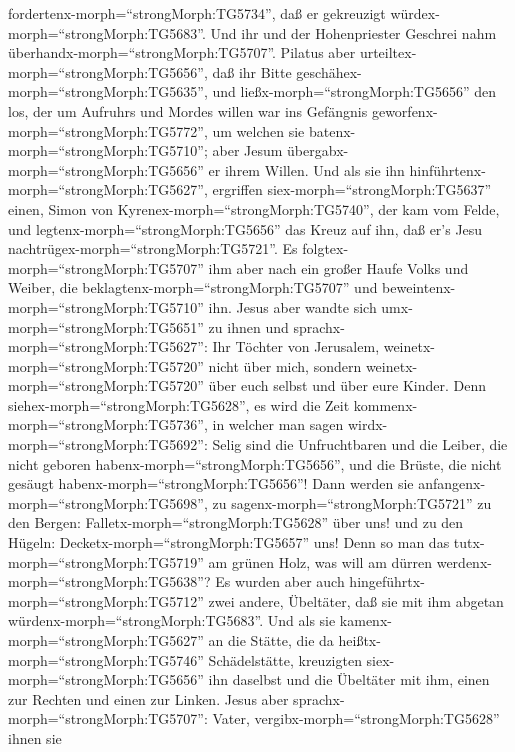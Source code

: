 fordertenx-morph=``strongMorph:TG5734'', daß er gekreuzigt
würdex-morph=``strongMorph:TG5683''. Und ihr und der Hohenpriester
Geschrei nahm überhandx-morph=``strongMorph:TG5707''. 
Pilatus aber urteiltex-morph=``strongMorph:TG5656'', daß ihr Bitte
geschähex-morph=``strongMorph:TG5635'',  und
ließx-morph=``strongMorph:TG5656'' den los, der um Aufruhrs und Mordes
willen war ins Gefängnis geworfenx-morph=``strongMorph:TG5772'', um
welchen sie batenx-morph=``strongMorph:TG5710''; aber Jesum
übergabx-morph=``strongMorph:TG5656'' er ihrem Willen.  Und
als sie ihn hinführtenx-morph=``strongMorph:TG5627'', ergriffen
siex-morph=``strongMorph:TG5637'' einen, Simon von
Kyrenex-morph=``strongMorph:TG5740'', der kam vom Felde, und
legtenx-morph=``strongMorph:TG5656'' das Kreuz auf ihn, daß er's Jesu
nachtrügex-morph=``strongMorph:TG5721''.  Es
folgtex-morph=``strongMorph:TG5707'' ihm aber nach ein großer Haufe
Volks und Weiber, die beklagtenx-morph=``strongMorph:TG5707'' und
beweintenx-morph=``strongMorph:TG5710'' ihn.  Jesus aber
wandte sich umx-morph=``strongMorph:TG5651'' zu ihnen und
sprachx-morph=``strongMorph:TG5627'': Ihr Töchter von Jerusalem,
weinetx-morph=``strongMorph:TG5720'' nicht über mich, sondern
weinetx-morph=``strongMorph:TG5720'' über euch selbst und über eure
Kinder.  Denn siehex-morph=``strongMorph:TG5628'', es wird
die Zeit kommenx-morph=``strongMorph:TG5736'', in welcher man sagen
wirdx-morph=``strongMorph:TG5692'': Selig sind die Unfruchtbaren und die
Leiber, die nicht geboren habenx-morph=``strongMorph:TG5656'', und die
Brüste, die nicht gesäugt habenx-morph=``strongMorph:TG5656''!
 Dann werden sie anfangenx-morph=``strongMorph:TG5698'', zu
sagenx-morph=``strongMorph:TG5721'' zu den Bergen:
Falletx-morph=``strongMorph:TG5628'' über uns! und zu den Hügeln:
Decketx-morph=``strongMorph:TG5657'' uns!  Denn so man das
tutx-morph=``strongMorph:TG5719'' am grünen Holz, was will am dürren
werdenx-morph=``strongMorph:TG5638''?  Es wurden aber auch
hingeführtx-morph=``strongMorph:TG5712'' zwei andere, Übeltäter, daß sie
mit ihm abgetan würdenx-morph=``strongMorph:TG5683''.  Und
als sie kamenx-morph=``strongMorph:TG5627'' an die Stätte, die da
heißtx-morph=``strongMorph:TG5746'' Schädelstätte, kreuzigten
siex-morph=``strongMorph:TG5656'' ihn daselbst und die Übeltäter mit
ihm, einen zur Rechten und einen zur Linken.  Jesus aber
sprachx-morph=``strongMorph:TG5707'': Vater,
vergibx-morph=``strongMorph:TG5628'' ihnen sie
